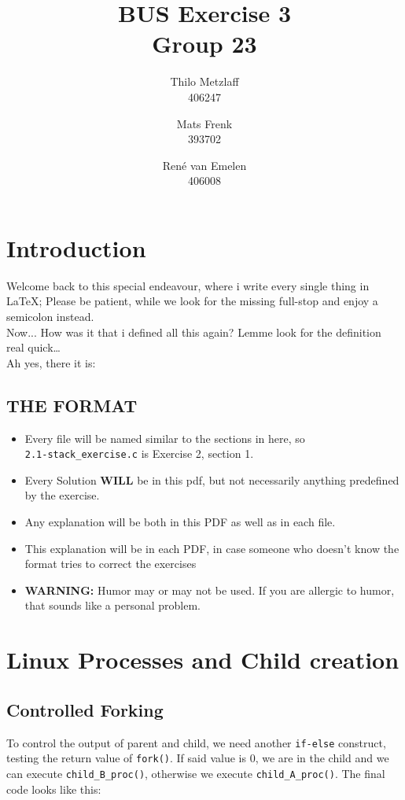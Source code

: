 \documentclass[a4paper, 11pt]{article}
\author{Thilo Metzlaff\\406247 \and Mats Frenk\\393702\and René van Emelen\\406008}
\title{BUS Exercise 3 \\ Group 23}
\begin{document}
    \maketitle
    \newpage

    \tableofcontents
    \newpage

    \section*{Introduction}
    Welcome back to this special endeavour, where i write every single thing in \LaTeX{}; Please be patient, while we look for the missing full-stop and enjoy a semicolon instead.\\
    Now... How was it that i defined all this again? Lemme look for the definition real quick\dots\\
    Ah yes, there it is:

    \subsection*{THE FORMAT}
    \begin{itemize}
        \item Every file will be named similar to the sections in here, so\\
              \texttt{2.1-stack\_exercise.c} is Exercise 2, section 1.
        \item Every Solution \textbf{WILL} be in this pdf, but not necessarily 
              anything predefined by the exercise.
        \item Any explanation will be both in this PDF as well as in each file.
        \item This explanation will be in each PDF, in case someone who doesn't
              know the format tries to correct the exercises
        \item \textbf{WARNING:} Humor may or may not be used. If you are allergic
              to humor, that sounds like a personal problem.
    \end{itemize}
    \newpage

    \section{Linux Processes and Child creation}
    
    \subsection{Controlled Forking}
    To control the output of parent and child, we need another \texttt{if-else} construct, testing the return value of 
    \texttt{fork()}. If said value is 0, we are in the child and we can execute \texttt{child\_B\_proc()}, otherwise we 
    execute \texttt{child\_A\_proc()}. The final code looks like this:
    
    \newpage
    
\end{document}
